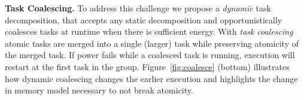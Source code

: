 
\textbf{Task Coalescing.} To address this challenge we propose a \emph{dynamic} task decomposition, that accepts any static decomposition and opportunistically coalesces tasks at runtime when there is sufficient energy. With \emph{task coalescing} atomic tasks are merged into a single (larger) task while preserving atomicity of the merged task. If power fails while a coalesced task is running, execution will restart at the first task in the group. Figure~\ref{fig:coalesce} (bottom) illustrates how dynamic coalescing changes the earlier execution and highlights the change in memory model necessary to not break atomicity.

